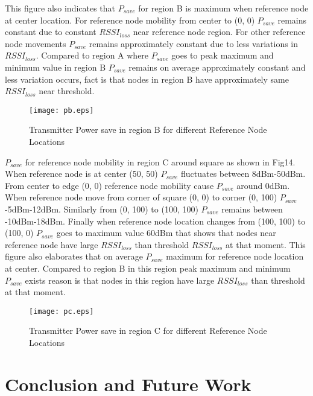 \documentclass[12pt, conference, compsocconf, onecolumn, draftcls]{IEEEtran}
\begin{document}
This figure also indicates  that $P_{save}$ for region B is maximum when reference node at center location. For reference node mobility from center to (0, 0) $P_{save}$ remains constant due to constant $RSSI_{loss}$ near reference node region. For other reference node movements $P_{save}$ remains approximately constant due to less variations in $RSSI_{loss}$. Compared to region A where $P_{save}$ goes to peak maximum and minimum value in region B $P_{save}$ remains on average approximately constant and less variation occurs,  fact is that nodes in region B have approximately same $RSSI_{loss}$ near threshold.

\begin{figure}[h]
\begin{center}
\texttt{[image: pb.eps]}
\caption{ Transmitter Power save in region B for different Reference Node Locations}
\end{center}
\end{figure}

$P_{save}$ for reference node mobility in region C around square as shown in Fig14. When reference node is at center (50, 50)  $P_{save}$ fluctuates between 8dBm-50dBm. From center to edge (0, 0) reference node mobility cause $P_{save}$ around 0dBm. When reference node move from corner of square (0, 0) to corner (0, 100) $P_{save}$ -5dBm-12dBm. Similarly from (0, 100) to (100, 100) $P_{save}$ remains between -10dBm-18dBm.  Finally when reference node location changes from (100, 100) to (100, 0) $P_{save}$ goes to maximum value 60dBm that shows that nodes near reference node have large $RSSI_{loss}$ than threshold $RSSI_{loss}$ at that moment. This figure also elaborates that on average $P_{save}$ maximum for reference node location at center. Compared to region B in this region peak maximum and minimum $P_{save}$ exists reason is that nodes in this region have large $RSSI_{loss}$ than threshold at that moment.
\begin{figure}[h]
\begin{center}
\texttt{[image: pc.eps]}
\caption{ Transmitter Power save in region C for different Reference Node Locations}
\end{center}
\end{figure}

\section{Conclusion and Future Work}
\end{document}
